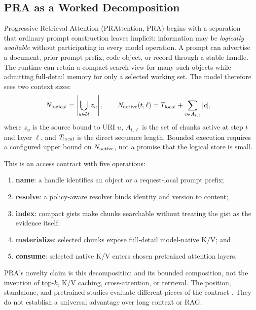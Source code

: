 \subsection{PRA as a Worked Decomposition}

Progressive Retrieval Attention (PRAttention, PRA) begins with a separation that ordinary
prompt construction leaves implicit: information may be \emph{logically available} without
participating in every model operation. A prompt can advertise a document, prior prompt
prefix, code object, or record through a stable handle. The runtime can retain a compact
search view for many such objects while admitting full-detail memory for only a selected
working set. The model therefore sees two context sizes:
\begin{equation}
N_{\rm logical}=\left|\bigcup_{u\in\mathcal U}z_u\right|,
\qquad
N_{\rm active}(t,\ell)=T_{\rm local}+\sum_{c\in A_{t,\ell}}|c|,
\end{equation}
where $z_u$ is the source bound to URI $u$, $A_{t,\ell}$ is the set of chunks active at
step $t$ and layer $\ell$, and $T_{\rm local}$ is the direct sequence length. Bounded
execution requires a configured upper bound on $N_{\rm active}$, not a promise that the
logical store is small.

This is an access contract with five operations:
\begin{enumerate}
\item \textbf{name}: a handle identifies an object or a request-local prompt prefix;
\item \textbf{resolve}: a policy-aware resolver binds identity and version to content;
\item \textbf{index}: compact gists make chunks searchable without treating the gist as
the evidence itself;
\item \textbf{materialize}: selected chunks expose full-detail model-native K/V; and
\item \textbf{consume}: selected native K/V enters chosen pretrained attention layers.
\end{enumerate}
PRA's novelty claim is this decomposition and its bounded composition, not the invention of
top-$k$, K/V caching, cross-attention, or retrieval. The position, standalone, and pretrained
studies evaluate different pieces of the contract \citep{simao2026praArchitecture,simao2026praStandalone,
simao2026praPosition,simao2026praHF}. They do not establish a universal advantage over long
context or RAG.


